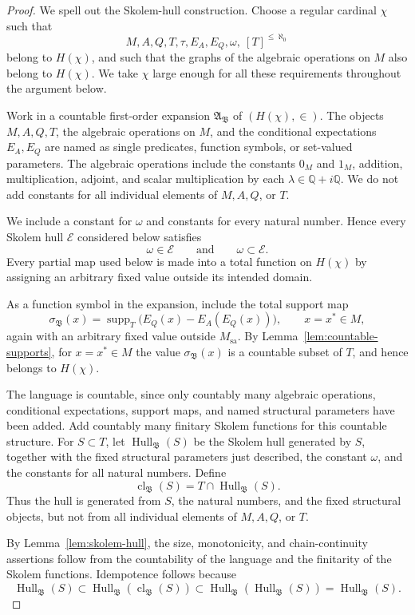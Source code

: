 \documentclass[11pt,letterpaper,reqno]{amsart}
\theoremstyle{definition}
\numberwithin{equation}{section}
\newcommand{\sa}{\mathrm{sa}}
\newcommand{\one}{1}
\newcommand{\cl}{\operatorname{cl}}
\DeclareMathOperator{\supp}{supp}
\DeclareMathOperator{\Hull}{Hull}
\begin{document}
\begin{proof}
We spell out the Skolem-hull construction. Choose a regular cardinal \(\chi\) such that
\[
   M,A,Q,T,\tau,E_A,E_Q,\omega,\ [T]^{\leq\aleph_0}
\]
belong to \(H(\chi)\), and such that the graphs of the algebraic operations on
\(M\) also belong to \(H(\chi)\).  We take \(\chi\) large enough for all these
requirements throughout the argument below.

Work in a countable first-order expansion \(\mathfrak A_{\mathfrak B}\) of
\((H(\chi),\in)\).  The objects \(M,A,Q,T\), the algebraic operations on \(M\),
and the conditional expectations \(E_A,E_Q\) are named as single predicates,
function symbols, or set-valued parameters. The algebraic operations include the constants \(0_M\) and \(\one_M\),
addition, multiplication, adjoint, and scalar multiplication by each
\(\lambda\in\mathbb Q+i\mathbb Q\).  We do not add constants for all individual
elements of \(M,A,Q\), or \(T\).

We include a constant for \(\omega\) and constants for every natural number.
Hence every Skolem hull \(\mathcal E\) considered below satisfies
\[
   \omega\in\mathcal E
   \qquad\text{and}\qquad
   \omega\subset\mathcal E .
\]
Every partial map used below is made into a total function on \(H(\chi)\) by
assigning an arbitrary fixed value outside its intended domain.

As a function symbol in the expansion, include the total support map
\[
   \sigma_{\mathfrak B}(x)=
   \supp_T\bigl(E_Q(x)-E_A(E_Q(x))\bigr),
   \qquad x=x^*\in M,
\]
again with an arbitrary fixed value outside \(M_{\sa}\).  By
Lemma~\ref{lem:countable-supports}, for \(x=x^*\in M\) the value
\(\sigma_{\mathfrak B}(x)\) is a countable subset of \(T\), and hence belongs
to \(H(\chi)\).

The language is countable, since only countably many algebraic operations,
conditional expectations, support maps, and named structural parameters have
been added.  Add countably many finitary Skolem functions for this countable
structure.
For \(S\subset T\), let \(\Hull_{\mathfrak B}(S)\) be the Skolem hull generated
by \(S\), together with the fixed structural parameters just described, the
constant \(\omega\), and the constants for all natural numbers.  Define
\[
   \cl_{\mathfrak B}(S)=T\cap\Hull_{\mathfrak B}(S).
\]
Thus the hull is generated from \(S\), the natural numbers, and the fixed
structural objects, but not from all individual elements of \(M,A,Q\), or \(T\).

By Lemma~\ref{lem:skolem-hull}, the size, monotonicity, and chain-continuity
assertions follow from the countability of the language and the finitarity of
the Skolem functions.
Idempotence follows because
\[
   \Hull_{\mathfrak B}(S)
   \subset \Hull_{\mathfrak B}(\cl_{\mathfrak B}(S))
   \subset \Hull_{\mathfrak B}(\Hull_{\mathfrak B}(S))
   =\Hull_{\mathfrak B}(S).
\]


\end{proof}
\end{document}
